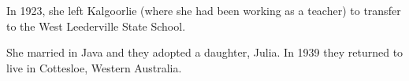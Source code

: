 
In 1923, she left Kalgoorlie (where she had been working as a teacher) to transfer to the West Leederville State School.\cite{VMkal}

She married  in Java\cite{LadiesSection} and they adopted a daughter, Julia. In 1939 they returned to live in Cottesloe, Western Australia. 
